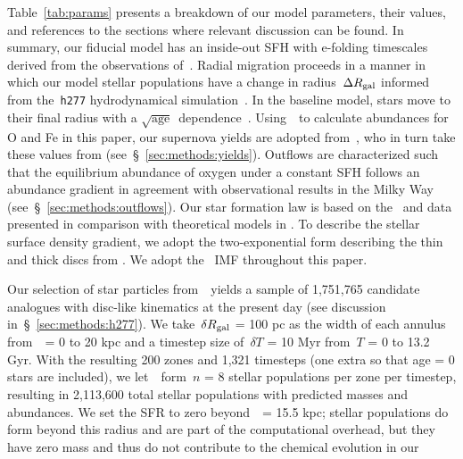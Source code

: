 \documentclass[draft2.tex]{subfiles}
\begin{document}
{\color{red} 
Table~\ref{tab:params} presents a breakdown of our model parameters, their 
values, and references to the sections where relevant discussion can be found. 
}
In summary, our fiducial model has an inside-out SFH with e-folding timescales 
derived from the observations of~\citet[][see discussion 
in~\S~\ref{sec:methods:sfhs}]{Sanchez2020}. 
Radial migration proceeds in a manner in which our model stellar populations 
have a change in radius~$\Delta R_\text{gal}$ informed from the~\texttt{h277} 
hydrodynamical simulation~\citep[][see discussion 
in~\S~\ref{sec:methods:h277}]{Christensen2012, Zolotov2012, Loebman2012, 
Loebman2014, Brooks2014}. 
In the baseline model, stars move to their final radius with a 
$\sqrt{\text{age}}$~dependence~\citep[][see discussion in 
\ref{sec:methods:migration}]{Frankel2018,Frankel2020}. 
Using~\vice~to calculate abundances for O and Fe in this paper, our supernova 
yields are adopted from~\citet{Johnson2020}, who in turn take these values from 
\citet{Weinberg2017} (see~\S~\ref{sec:methods:yields}). 
Outflows are characterized such that the equilibrium abundance of oxygen under 
a constant SFH follows an abundance gradient in agreement with observational 
results in the Milky Way (see~\S~\ref{sec:methods:outflows}). 
Our star formation law is based on the~\citet{Bigiel2010} and 
\citet{Leroy2013} data presented in comparison with theoretical models in 
\citet[][see~\S~\ref{sec:methods:sfe}]{Krumholz2018a}. 
To describe the stellar surface density gradient, we adopt the two-exponential 
form describing the thin and thick discs from 
\citet[][see~\S~\ref{sec:methods:surface_density_gradient}]{Bland-Hawthorn2016}. 
We adopt the~\citet{Kroupa2001} IMF throughout this paper. 
\par 
Our selection of star particles from~\hsim~yields a sample of 1,751,765 
candidate analogues with disc-like kinematics at the present day (see 
discussion in~\S~\ref{sec:methods:h277}). 
We take~$\delta R_\text{gal}$ = 100 pc as the width of each annulus from~\rgal~= 0 to 
20 kpc and a timestep size of~$\delta T$ = 10 Myr from~$T$ = 0 to 13.2 Gyr. 
With the resulting 200 zones and 1,321 timesteps (one extra so that age = 0 
stars are included), we let~\vice~form~$n$ = 8 stellar populations per zone per 
timestep, resulting in 2,113,600 total stellar populations with predicted 
masses and abundances. 
We set the SFR to zero beyond~\rgal~= 15.5 kpc; stellar populations 
do form beyond this radius and are part of the computational overhead, but they 
have zero mass and thus do not contribute to the chemical evolution in our 
\end{document}
